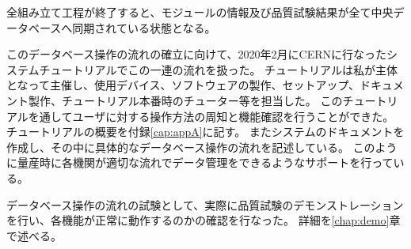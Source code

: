 全組み立て工程が終了すると、モジュールの情報及び品質試験結果が全て中央データベースへ同期されている状態となる。


このデータベース操作の流れの確立に向けて、2020年2月にCERNに行なったシステムチュートリアルでこの一連の流れを扱った。
チュートリアルは私が主体となって主催し、使用デバイス、ソフトウェアの製作、セットアップ、ドキュメント製作、チュートリアル本番時のチューター等を担当した。
このチュートリアルを通してユーザに対する操作方法の周知と機能確認を行うことができた。
チュートリアルの概要を付録\ref{cap:appA}に記す。
またシステムのドキュメント\cite{4-7}を作成し、その中に具体的なデータベース操作の流れを記述している。
このように量産時に各機関が適切な流れでデータ管理をできるようなサポートを行っている。


データベース操作の流れの試験として、実際に品質試験のデモンストレーションを行い、各機能が正常に動作するのかの確認を行なった。
詳細を\ref{chap:demo}章で述べる。

